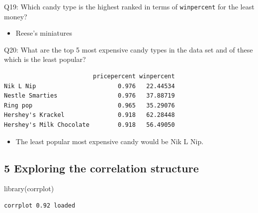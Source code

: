 \documentclass[
  letterpaper,
  DIV=11,
  numbers=noendperiod]{scrartcl}
\newenvironment{Shaded}{\begin{snugshade}}{\end{snugshade}}
\newcommand{\AttributeTok}[1]{\textcolor[rgb]{0.40,0.45,0.13}{#1}}
\newcommand{\ConstantTok}[1]{\textcolor[rgb]{0.56,0.35,0.01}{#1}}
\newcommand{\DecValTok}[1]{\textcolor[rgb]{0.68,0.00,0.00}{#1}}
\newcommand{\FunctionTok}[1]{\textcolor[rgb]{0.28,0.35,0.67}{#1}}
\newcommand{\NormalTok}[1]{\textcolor[rgb]{0.00,0.23,0.31}{#1}}
\newcommand{\OtherTok}[1]{\textcolor[rgb]{0.00,0.23,0.31}{#1}}
\newcommand{\SpecialCharTok}[1]{\textcolor[rgb]{0.37,0.37,0.37}{#1}}
\providecommand{\tightlist}{%
  \setlength{\itemsep}{0pt}\setlength{\parskip}{0pt}}\usepackage{longtable,booktabs,array}
\begin{document}
Q19: Which candy type is the highest ranked in terms of
\texttt{winpercent} for the least money?

\begin{itemize}
\tightlist
\item
  Reese's miniatures
\end{itemize}

Q20: What are the top 5 most expensive candy types in the data set and
of these which is the least popular?

\begin{Shaded}
\end{Shaded}

\begin{verbatim}
                         pricepercent winpercent
Nik L Nip                       0.976   22.44534
Nestle Smarties                 0.976   37.88719
Ring pop                        0.965   35.29076
Hershey's Krackel               0.918   62.28448
Hershey's Milk Chocolate        0.918   56.49050
\end{verbatim}

\begin{itemize}
\tightlist
\item
  The least popular most expensive candy would be Nik L Nip.
\end{itemize}

\hypertarget{exploring-the-correlation-structure}{%
\subsection{5 Exploring the correlation
structure}\label{exploring-the-correlation-structure}}

\begin{Shaded}
\begin{Highlighting}[]
\FunctionTok{library}\NormalTok{(corrplot)}
\end{Highlighting}
\end{Shaded}

\begin{verbatim}
corrplot 0.92 loaded
\end{verbatim}
\end{document}
